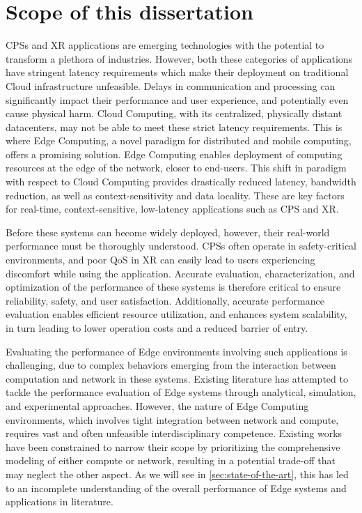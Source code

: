 \section{Scope of this dissertation}
\glsresetall%

\glspl{CPS} and \gls{XR} applications are emerging technologies with the potential to transform a plethora of industries.
However, both these categories of applications have stringent latency requirements which make their deployment on traditional Cloud infrastructure unfeasible.
Delays in communication and processing can significantly impact their performance and user experience, and potentially even cause physical harm.
Cloud Computing, with its centralized, physically distant datacenters, may not be able to meet these strict latency requirements.
This is where Edge Computing, a novel paradigm for distributed and mobile computing, offers a promising solution.
Edge Computing enables deployment of computing resources at the edge of the network, closer to end-users.
This shift in paradigm with respect to Cloud Computing provides drastically reduced latency, bandwidth reduction, as well as context-sensitivity and data locality.
These are key factors for real-time, context-sensitive, low-latency applications such as \gls{CPS} and \gls{XR}.



Before these systems can become widely deployed, however, their real-world performance must be thoroughly understood.
\glspl{CPS} often operate in safety-critical environments, and poor \gls{QoS} in \gls{XR} can easily lead to users experiencing discomfort while using the application.
Accurate evaluation, characterization, and optimization of the performance of these systems is therefore critical to ensure reliability, safety, and user satisfaction.
Additionally, accurate performance evaluation enables efficient resource utilization, and enhances system scalability, in turn leading to lower operation costs and a reduced barrier of entry.

Evaluating the performance of Edge environments involving such applications is challenging, due to complex behaviors emerging from the interaction between computation and network in these systems.
Existing literature has attempted to tackle the performance evaluation of Edge systems through analytical, simulation, and experimental approaches.
However, the nature of Edge Computing environments, which involves tight integration between network and compute, requires vast and often unfeasible interdisciplinary competence.
Existing works have been constrained to narrow their scope by prioritizing the comprehensive modeling of either compute or network, resulting in a potential trade-off that may neglect the other aspect.
As we will see in \cref{sec:state-of-the-art}, this has led to an incomplete understanding of the overall performance of Edge systems and applications in literature.

